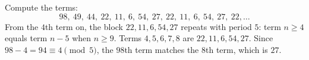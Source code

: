 Compute the terms:
\[
98,\ 49,\ 44,\ 22,\ 11,\ 6,\ 54,\ 27,\ 22,\ 11,\ 6,\ 54,\ 27,\ 22,\dots
\]
From the $4$th term on, the block $22,11,6,54,27$ repeats with period $5$: term $n\ge4$ equals term $n-5$ when $n\ge9$. Terms $4,5,6,7,8$ are $22,11,6,54,27$. Since $98-4=94\equiv4\pmod5$, the $98$th term matches the $8$th term, which is $\boxed{27}$.
